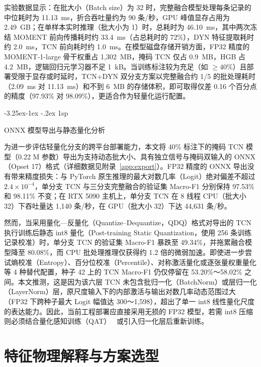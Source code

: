 \documentclass[12pt]{iopjournal}
\makeatletter
\renewcommand\subsection{\@startsection{subsection}{2}{\z@}%
                   {-3.25ex\@plus -1ex \@minus -.2ex}%
                   {1sp}%
                   {\reset@font\normalsize\bfseries\raggedright}}
\makeatother
\begin{document}
实验数据显示：在批大小（Batch size）为 32 时，完整融合模型处理每条记录的中位耗时为 11.13~ms，折合吞吐量约为 90 条/秒，GPU 峰值显存占用为 2.49~GB；在单样本实时推理（批大小为 1）时，总耗时为 46.10~ms，其中两次冻结 MOMENT 前向传播耗时约 33.4~ms（占总耗时的 72\%），DYN 特征提取耗时约 2.0~ms，TCN 前向耗时约 1.0~ms。在模型磁盘存储开销方面，FP32 精度的 MOMENT-1-large 骨干权重占 1,302~MB，掩码 TCN 仅占 0.9~MB，HGB 占 4.2~MB，逻辑回归元学习器不足 1~kB。当训练标注较为充足（如 $\ge 40\%$）且部署受限于显存或时延时，TCN+DYN 双分支方案以完整融合约 1/5 的批处理耗时（2.09~ms 对 11.13~ms）和不到 6~MB 的存储体积，即可取得仅差 0.16 个百分点的精度（97.93\% 对 98.09\%），更适合作为轻量化运行配置。

\subsection{ONNX 模型导出与静态量化分析}

为进一步评估轻量化分支的跨平台部署能力，本文将 40\% 标注下的掩码 TCN 模型（0.22 M 参数）导出为支持动态批大小、具有独立信号与掩码双输入的 ONNX（Opset 17）格式（详细数据见附录~\ref{app:export}）。FP32 精度的 ONNX 导出没有带来精度损失：与 PyTorch 原生推理的最大对数几率（Logit）绝对偏差不超过 $2.4\times 10^{-4}$，单分支 TCN 与三分支完整融合的验证集 Macro-F1 分别保持 97.53\% 和 98.11\% 不变；在 RTX 5090 主机上，单分支 TCN 在 8 线程 CPU（批大小 32）下吞吐量达 1,140 条/秒，在 GPU（批大小 32）下达 44,631 条/秒。

然而，当采用量化—反量化（Quantize--Dequantize，QDQ）格式对导出的 TCN 执行训练后静态 int8 量化（Post-training Static Quantization，使用 256 条训练记录校准）时，单分支 TCN 的验证集 Macro-F1 暴跌至 49.34\%，并拖累融合模型降至 80.08\%，而 CPU 批处理推理仅获得约 1.2 倍的微弱加速。即使进一步尝试熵校准（Entropy）、百分位校准（Percentile）、对称激活量化或逐张量权重量化等 4 种替代配置，种子 42 上的 TCN Macro-F1 仍仅停留在 53.20\%～58.02\% 之间。本文推测，这是因为该六层 TCN 未包含批归一化（BatchNorm）或层归一化（LayerNorm）层，原尺度输入下的内部激活与输出对数几率动态范围过大（FP32 下跨种子最大 Logit 幅值达 300～1,598），超出了单一 int8 线性量化尺度的表达能力。因此，当前工程部署应直接采用无损的 FP32 模型，若需 int8 压缩则必须结合量化感知训练（QAT）~\cite{jacob2018} 或引入归一化层后重新训练。

\section{特征物理解释与方案选型}\label{sec:discussion}
\end{document}
